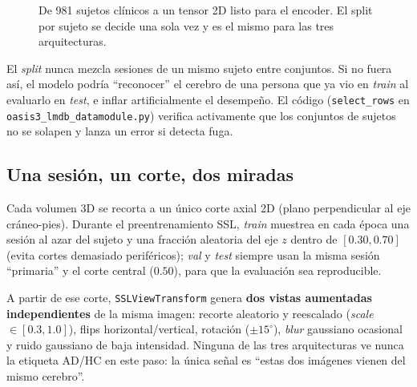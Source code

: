 \documentclass[11pt,a4paper]{article}
\begin{document}
\begin{figure}[htbp]
\caption{De 981 sujetos clínicos a un tensor 2D listo para el encoder. El
split por sujeto se decide una sola vez y es el mismo para las tres
arquitecturas.}
\label{fig:pipeline}
\end{figure}

\begin{ideabox}
El \emph{split} nunca mezcla sesiones de un mismo sujeto entre conjuntos. Si
no fuera así, el modelo podría ``reconocer'' el cerebro de una persona que ya
vio en \emph{train} al evaluarlo en \emph{test}, e inflar artificialmente el
desempeño. El código (\texttt{select\_rows} en
\texttt{oasis3\_lmdb\_datamodule.py}) verifica activamente que los conjuntos
de sujetos no se solapen y lanza un error si detecta fuga.
\end{ideabox}

\subsection{Una sesión, un corte, dos miradas}

Cada volumen 3D se recorta a un único corte axial 2D (plano perpendicular al
eje cráneo-pies). Durante el preentrenamiento SSL, \emph{train} muestrea en
cada época una sesión al azar del sujeto y una fracción aleatoria del eje $z$
dentro de $[0.30, 0.70]$ (evita cortes demasiado periféricos); \emph{val} y
\emph{test} siempre usan la misma sesión ``primaria'' y el corte central
($0.50$), para que la evaluación sea reproducible.

A partir de ese corte, \texttt{SSLViewTransform} genera \textbf{dos vistas
aumentadas independientes} de la misma imagen: recorte aleatorio y reescalado
(\emph{scale} $\in[0.3,1.0]$), flips horizontal/vertical, rotación
($\pm15^\circ$), \emph{blur} gaussiano ocasional y ruido gaussiano de baja
intensidad. Ninguna de las tres arquitecturas ve nunca la etiqueta AD/HC en
este paso: la única señal es ``estas dos imágenes vienen del mismo cerebro''.
\end{document}
